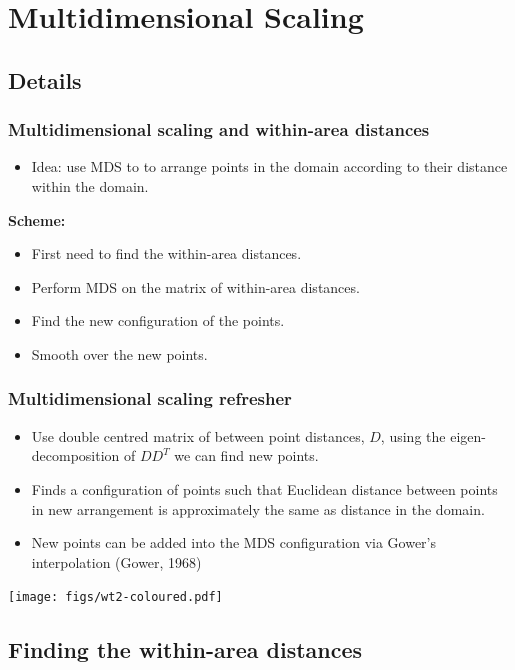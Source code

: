 \documentclass[ignorenonframetext]{beamer} %
\newcommand{\bc}{\begin{center}}
\newcommand{\ec}{\end{center}}
\newcommand{\bi}{\begin{itemize}}
\newcommand{\ei}{\end{itemize}}
\begin{document}
\section{Multidimensional Scaling}

\subsection{Details}

\begin{frame}
	\frametitle{Multidimensional scaling and within-area distances}
       \bi
         \item Idea: use MDS to to arrange points in the domain according to their distance within the domain.
         \ei
         \bc \textbf{Scheme:} \ec
         \bi
         \item First need to find the within-area distances.
         \item Perform MDS on the matrix of within-area distances.
         \item Find the new configuration of the points.
         \item Smooth over the new points.

        \ei
\end{frame}

\begin{frame}
	\frametitle{Multidimensional scaling refresher}
       \bi
         \item Use double centred matrix of between point distances, $D$, using the eigen-decomposition of $DD^T$ we can find new points.
         \item Finds a configuration of points such that Euclidean distance between points in new arrangement is approximately the same as distance in the domain.
          \item New points can be added into the MDS configuration via Gower's interpolation (Gower, 1968)
        \ei
            \centering
              \texttt{[image: figs/wt2-coloured.pdf]}\\
        
\end{frame}

\subsection{Finding the within-area distances}
\end{document}
